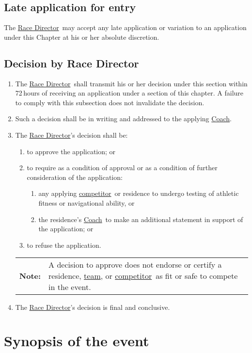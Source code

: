 \documentclass[12pt]{report}
\newcommand{\hyplink}[1]{\hyperlink{#1}{{#1}}}
\newcommand\amended{%
}
\newcommand{\Coach}{\hyplink{Coach}}\newcommand{\xCaptain}{Coach}
\newcommand{\competitor}{\hyplink{competitor}}
\newcommand\Event{event}
\newcommand{\note}[1]{{\small%
\begin{tabular}
  {p{0.75cm}p{11.25cm}}
  \textbf{Note:}&#1
\end{tabular}
}}
\newcommand{\RaceDirector}{\hyplink{Race Director}}
\newcommand{\team}{\hyplink{team}}
\begin{document}
  \section{Late application for entry}
  \begin{fenumerate}
    \item The \RaceDirector\ may accept any late application or variation to an application under this Chapter at his or her absolute discretion.
  \end{fenumerate}
  \section{Decision by Race Director}%
  \begin{enumerate}
    \item The \RaceDirector\ shall transmit his or her decision under this section within 72\,hours of receiving an application under a section of this chapter. A failure to comply with this subsection does not invalidate the decision.
    \item Such a decision shall be in writing and addressed to the applying \Coach.
    \item The \RaceDirector's decision shall be:
     \begin{enumerate}
     \item to approve the application; or
     \item to require as a condition of approval or as a condition of further consideration of the application:
      \begin{enumerate}
      \item any applying \competitor\ or residence to undergo testing of athletic fitness or navigational ability, or
       \item the residence's \Coach\ to make an additional statement in support of the application; or
         \end{enumerate}
         \item to refuse the application.
     \end{enumerate}
     \note{A decision to approve does not endorse or certify a residence, \team, or \competitor\ as fit or safe to compete in the \Event.}
     \item The \RaceDirector's decision is final and conclusive.
  \end{enumerate}
  \chapter{Synopsis of the event}\label{chapter:Synopsis}
\end{document}
